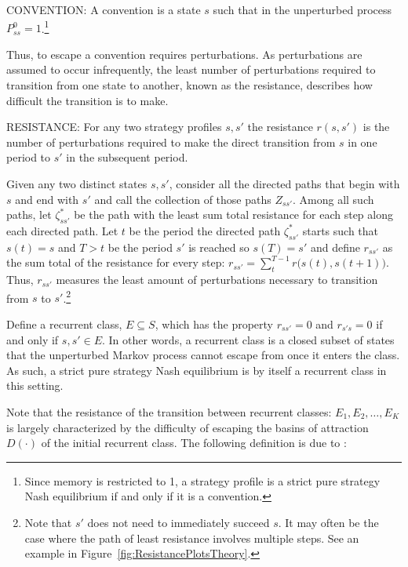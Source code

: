 \begin{definition}
    CONVENTION: A convention is a state $s$ such that in the unperturbed process $P^0_{ss} = 1$.\footnote{Since memory is restricted to 1, a strategy profile is a strict pure strategy Nash equilibrium if and only if it is a convention.}
\end{definition}

Thus, to escape a convention requires perturbations. As perturbations are assumed to occur infrequently, the least number of perturbations required to transition from one state to another, known as the resistance, describes how difficult the transition is to make.

\begin{definition}
    RESISTANCE: For any two strategy profiles $s, s'$ the resistance $r(s, s')$ is the number of perturbations required to make the direct transition from $s$ in one period to $s'$ in the subsequent period. 
\end{definition}

Given any two distinct states $s, s'$, consider all the directed paths that begin with $s$ and end with $s'$ and call the collection of those paths $Z_{ss'}$. Among all such paths, let $\zeta^*_{ss'}$ be the path with the least sum total resistance for each step along each directed path. Let $t$ be the period the directed path $\zeta^*_{ss'}$ starts such that $s(t) = s$ and $T>t$ be the period $s'$ is reached so $s(T) = s'$ and define $r_{ss'}$ as the sum total of the resistance for every step: $ r_{ss'} = \sum \limits_{t}^{T-1} r\big(s(t), s(t+1)\big)$. Thus, $r_{ss'}$ measures the least amount of perturbations necessary to transition from $s$ to $s'$.\footnote{Note that $s'$ does not need to immediately succeed $s$. It may often be the case where the path of least resistance involves multiple steps. See an example in Figure~\ref{fig:ResistancePlotsTheory}.}

Define a recurrent class, $E \subseteq S$, which has the property $r_{ss'} = 0$ and $r_{s's} = 0$ if and only if $s, s' \in E$. In other words, a recurrent class is a closed subset of states that the unperturbed Markov process cannot escape from once it enters the class. As such, a strict pure strategy Nash equilibrium is by itself a recurrent class in this setting.

Note that the resistance of the transition between recurrent classes: $E_1, E_2, \dots, E_K$ is largely characterized by the difficulty of escaping the basins of attraction $D( \cdot )$ of the initial recurrent class. The following definition is due to \cite{ellison2000basins}:
    
